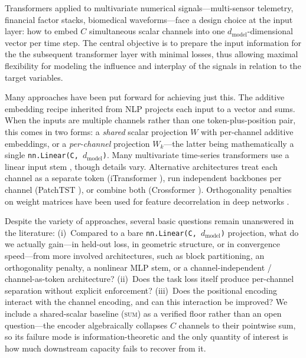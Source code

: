 \documentclass[11pt]{article}
\begin{document}
Transformers applied to multivariate numerical signals---multi-sensor
telemetry, financial factor stacks, biomedical waveforms---face a
design choice at the input layer: how to embed $C$ simultaneous scalar
channels into one $d_{\text{model}}$-dimensional vector per time step.
The central objective is to prepare the input information for the
the subsequent transformer layer with minimal losses, thus allowing
maximal flexibility for modeling the influence and interplay of the
signals in relation to the target variables.

Many approaches have been put forward for achieving just this.
The additive embedding recipe inherited from NLP
\citep{vaswani2017attention} projects each input to a vector and sums.
When the inputs are multiple channels rather than one token-plus-position
pair, this comes in two forms: a \emph{shared} scalar projection $W$
with per-channel additive embeddings, or a \emph{per-channel} projection
$W_k$---the latter being mathematically a single
\texttt{nn.Linear(C, $d_{\text{model}}$)}. Many multivariate
time-series transformers use a linear input stem
\citep{zhou2021informer,wu2023timesnet}, though details vary.
Alternative architectures treat each channel as a separate token
(iTransformer \citep{liu2024itransformer}), run independent backbones
per channel (PatchTST \citep{nie2023patchtst}), or combine both
(Crossformer \citep{zhang2023crossformer}). Orthogonality penalties on
weight matrices have been used for feature decorrelation in deep
networks \citep{bansal2018gainsorthogonality}.

Despite the variety of approaches, several basic questions remain
unanswered in the literature:
(i)~Compared to a bare \texttt{nn.Linear(C, $d_{\text{model}}$)}
projection, what do we actually gain---in held-out loss, in
geometric structure, or in convergence speed---from more involved 
architectures, such as block
partitioning, an orthogonality penalty, a nonlinear MLP stem, or a
channel-independent / channel-as-token architecture?
(ii)~Does the task loss itself produce per-channel separation
without explicit enforcement?
(iii)~Does the positional encoding interact with the channel
encoding, and can this interaction be improved?
We include a shared-scalar baseline (\textsc{sum}) as a verified
floor rather than an open question---the encoder algebraically
collapses $C$ channels to their pointwise sum, so its failure mode
is information-theoretic and the only quantity of interest is how
much downstream capacity fails to recover from it.
\end{document}
